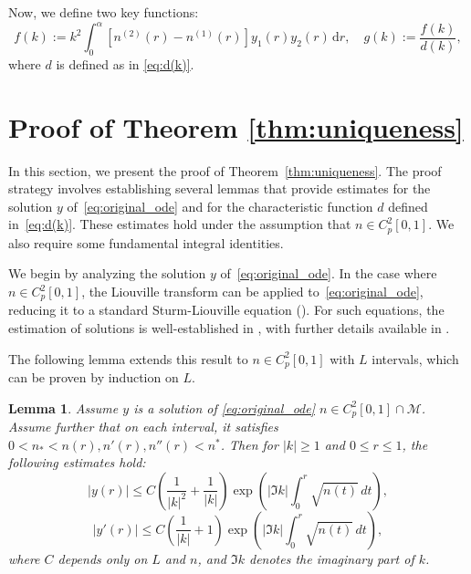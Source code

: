\documentclass[11pt,reqno]{amsart}
\newtheorem{lemma}{Lemma}[section]
\theoremstyle{definition}
\theoremstyle{remark}
\numberwithin{equation}{section}
\begin{document}
Now, we define two key functions:
\begin{equation}\label{eq:def f g}
f(k):=k^2 \int_{0}^{\alpha} \left[n^{(2)}(r) - n^{(1)}(r)\right] y_1(r) y_2(r) \, \mathrm{d} r,
\quad		g(k):=\frac{f(k)}{d(k)},	
\end{equation}
where $d$ is defined as in \eqref{eq:d(k)}.



\section{Proof of Theorem \ref{thm:uniqueness}}\label{sec:thm2.1}
In this section, we present the proof of Theorem~\ref{thm:uniqueness}. The proof strategy involves establishing several lemmas that provide estimates for the solution $y$ of~\eqref{eq:original_ode} and for the characteristic function $d$ defined in~\eqref{eq:d(k)}. These estimates hold under the assumption that $n\in C^2_p[0,1]$. We also require some fundamental integral identities.

We begin by analyzing the solution $y$ of~\eqref{eq:original_ode}. In the case where  $n\in C^2_p[0,1]$, the Liouville transform can be applied to~\eqref{eq:original_ode}, reducing it to a standard Sturm-Liouville equation (\cite{CCH16}). For such equations, the estimation of solutions is well-established in \cite{PT87}, with further details available in \cite{AGP11}.


The following lemma extends this result to $n\in C^2_p[0,1]$ with $L$ intervals, which can be proven by induction on $L$.
\begin{lemma}\label{lem:y,y'}
Assume $y$ is a solution of \eqref{eq:original_ode} $n\in C^2_p[0,1] \cap \mathcal{M}$.
Assume further that on each interval, it satisfies $0 < n_* < n(r), n'(r), n''(r) < n^*$.
Then for $|k| \geq 1 $ and $0 \leq r \leq 1$, the following estimates hold:
	\begin{equation}\label{eq:y}
		\left| y(r) \right| \leq C \left( \frac{1}{|k|^2} + \frac{1}{|k|} \right)\exp\left( \left| \Im k \right| \int_{0}^{r} \sqrt{n(t)} \, dt \right),
	\end{equation}
	\begin{equation}\label{eq:y'}
		\left| y'(r) \right| \leq C \left( \frac{1}{|k|} + 1 \right)\exp\left( \left| \Im k \right| \int_{0}^{r} \sqrt{n(t)} \, dt \right),
	\end{equation}	
where $C$ depends only on $L$ and $n$, and $\Im k$ denotes the imaginary part of $k$.
\end{lemma}
\end{document}

